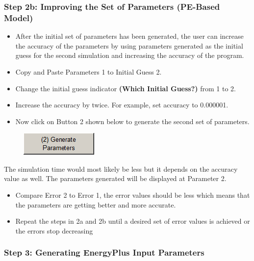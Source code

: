 \subsubsection{Step 2b: Improving the Set of Parameters (PE-Based Model)}\label{step-2b-improving-the-set-of-parameters-pe-based-model-000}

\begin{itemize}
\item
  After the initial set of parameters has been generated, the user can increase the accuracy of the parameters by using parameters generated as the initial guess for the second simulation and increasing the accuracy of the program.
\item
  Copy and Paste Parameters 1 to Initial Guess 2.
\item
  Change the initial guess indicator \textbf{(Which Initial Guess?)} from 1 to 2.
\item
  Increase the accuracy by twice. For example, set accuracy to 0.000001.
\item
  Now click on Button 2 shown below to generate the second set of parameters.
\end{itemize}

\begin{figure}[htbp]
\centering
\includegraphics{media/image041.png}
\caption{}
\end{figure}

The simulation time would most likely be less but it depends on the accuracy value as well. The parameters generated will be displayed at Parameter 2.

\begin{itemize}
\item
  Compare Error 2 to Error 1, the error values should be less which means that the parameters are getting better and more accurate.
\item
  Repeat the steps in 2a and 2b until a desired set of error values is achieved or the errors stop decreasing
\end{itemize}

\subsubsection{Step 3: Generating EnergyPlus Input Parameters}\label{step-3-generating-energyplus-input-parameters-000}

